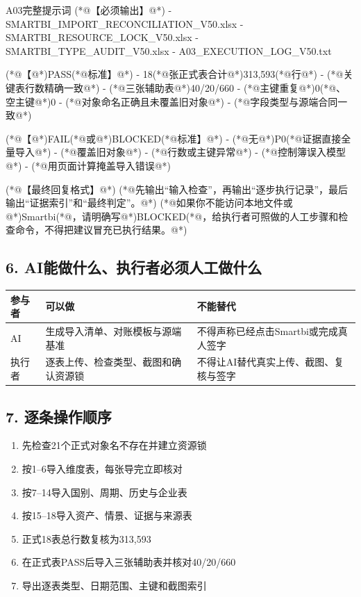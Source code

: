 \documentclass[UTF8,openany,zihao=-4]{ctexbook}
\renewcommand{\_}{\textunderscore\allowbreak}
\begin{document}
\begin{PromptBox}{A03完整提示词}
(*@{\promptcjk 【必须输出】}@*)
- SMARTBI_IMPORT_RECONCILIATION_V50.xlsx
- SMARTBI_RESOURCE_LOCK_V50.xlsx
- SMARTBI_TYPE_AUDIT_V50.xlsx
- A03_EXECUTION_LOG_V50.txt

(*@{\promptcjk 【}@*)PASS(*@{\promptcjk 标准】}@*)
- 18(*@{\promptcjk 张正式表合计}@*)313,593(*@{\promptcjk 行}@*)
- (*@{\promptcjk 关键表行数精确一致}@*)
- (*@{\promptcjk 三张辅助表}@*)40/20/660
- (*@{\promptcjk 主键重复}@*)0(*@{\promptcjk 、空主键}@*)0
- (*@{\promptcjk 对象命名正确且未覆盖旧对象}@*)
- (*@{\promptcjk 字段类型与源端合同一致}@*)

(*@{\promptcjk 【}@*)FAIL(*@{\promptcjk 或}@*)BLOCKED(*@{\promptcjk 标准】}@*)
- (*@{\promptcjk 无}@*)P0(*@{\promptcjk 证据直接全量导入}@*)
- (*@{\promptcjk 覆盖旧对象}@*)
- (*@{\promptcjk 行数或主键异常}@*)
- (*@{\promptcjk 控制簿误入模型}@*)
- (*@{\promptcjk 用页面计算掩盖导入错误}@*)

(*@{\promptcjk 【最终回复格式】}@*)
(*@{\promptcjk 先输出“输入检查”，再输出“逐步执行记录”，最后输出“证据索引”和“最终判定”。}@*)
(*@{\promptcjk 如果你不能访问本地文件或}@*)Smartbi(*@{\promptcjk ，请明确写}@*)BLOCKED(*@{\promptcjk ，给执行者可照做的人工步骤和检查命令，不得把建议冒充已执行结果。}@*)
\end{PromptBox}

\subsection*{6. AI能做什么、执行者必须人工做什么}
\noindent\begin{tabularx}{\textwidth}{@{}p{}XX@{}}
\toprule
\textbf{参与者} & \textbf{可以做} & \textbf{不能替代} \\
\midrule
AI & 生成导入清单、对账模板与源端基准 & 不得声称已经点击Smartbi或完成真人签字 \\
执行者 & 逐表上传、检查类型、截图和确认资源锁 & 不得让AI替代真实上传、截图、复核与签字 \\
\bottomrule
\end{tabularx}

\subsection*{7. 逐条操作顺序}
\begin{enumerate}
\item 先检查21个正式对象名不存在并建立资源锁
\item 按1--6导入维度表，每张导完立即核对
\item 按7--14导入国别、周期、历史与企业表
\item 按15--18导入资产、情景、证据与来源表
\item 正式18表总行数复核为313,593
\item 在正式表PASS后导入三张辅助表并核对40/20/660
\item 导出逐表类型、日期范围、主键和截图索引
\end{enumerate}
\end{document}
